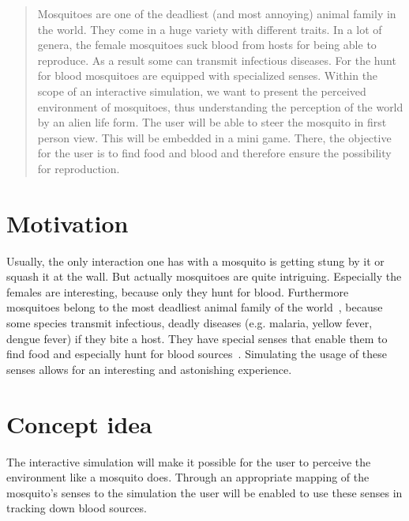 \documentclass{acm_proc_article-sp}
\begin{document}
\maketitle
\begin{abstract}
Mosquitoes are one of the deadliest (and most annoying) animal family in the world. They come in a huge variety with different traits. In a lot of genera, the female mosquitoes suck blood from hosts for being able to reproduce. As a result some can transmit infectious diseases. For the hunt for blood mosquitoes are equipped with specialized senses. Within the scope of an interactive simulation, we want to present the perceived environment of mosquitoes, thus understanding the perception of the world by an alien life form. The user will be able to steer the mosquito in first person view. This will be embedded in a mini game. There, the objective for the user is to find food and blood and therefore ensure the possibility for reproduction.
\end{abstract}






\section{Motivation}
Usually, the only interaction one has with a mosquito is getting stung by it or squash it at the wall. But actually mosquitoes are quite intriguing. Especially the females are interesting, because only they hunt for blood. Furthermore mosquitoes belong to the most deadliest animal family of the world~\cite{billG}, because some species transmit infectious, deadly diseases (e.g. malaria, yellow fever, dengue fever) if they bite a host. They have special senses that enable them to find food and especially hunt for blood sources~\cite{wiki_mosq}. Simulating the usage of these senses allows for an interesting and astonishing experience.


\section{Concept idea}
The interactive simulation will make it possible for the user to perceive the environment like a mosquito does. Through an appropriate mapping of the mosquito's senses to the simulation the user will be enabled to use these senses in tracking down blood sources.
\end{document}
